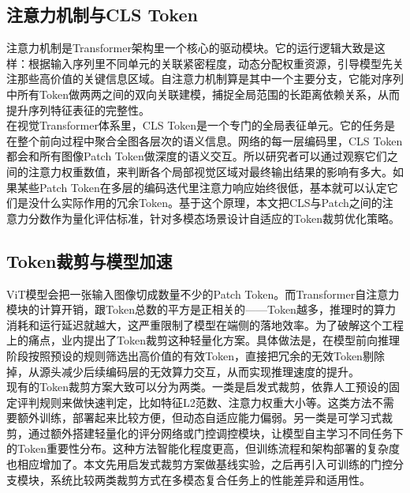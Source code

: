 \documentclass{article}
\begin{document}
{{{{{{{{		\subsection{注意力机制与CLS Token}
		{\setlength{\parindent}{2em}\setlength{\baselineskip}{20pt}\selectfont
			注意力机制是Transformer架构里一个核心的驱动模块。它的运行逻辑大致是这样：根据输入序列里不同单元的关联紧密程度，动态分配权重资源，引导模型先关注那些高价值的关键信息区域。自注意力机制算是其中一个主要分支，它能对序列中所有Token做两两之间的双向关联建模，捕捉全局范围的长距离依赖关系，从而提升序列特征表征的完整性。\\
			在视觉Transformer体系里，CLS Token是一个专门的全局表征单元。它的任务是在整个前向过程中聚合全图各层次的语义信息。网络的每一层编码里，CLS Token都会和所有图像Patch Token做深度的语义交互。所以研究者可以通过观察它们之间的注意力权重数值，来判断各个局部视觉区域对最终输出结果的影响有多大。如果某些Patch Token在多层的编码迭代里注意力响应始终很低，基本就可以认定它们是没什么实际作用的冗余Token。基于这个原理，本文把CLS与Patch之间的注意力分数作为量化评估标准，针对多模态场景设计自适应的Token裁剪优化策略。
		\subsection{Token裁剪与模型加速}
		{\setlength{\parindent}{2em}\setlength{\baselineskip}{20pt}\selectfont
			ViT模型会把一张输入图像切成数量不少的Patch Token。而Transformer自注意力模块的计算开销，跟Token总数的平方是正相关的——Token越多，推理时的算力消耗和运行延迟就越大，这严重限制了模型在端侧的落地效率。为了破解这个工程上的痛点，业内提出了Token裁剪这种轻量化方案。具体做法是，在模型前向推理阶段按照预设的规则筛选出高价值的有效Token，直接把冗余的无效Token剔除掉，从源头减少后续编码层的无效算力交互，从而实现推理速度的提升。\\
			现有的Token裁剪方案大致可以分为两类。一类是启发式裁剪，依靠人工预设的固定评判规则来做快速判定，比如特征L2范数、注意力权重大小等。这类方法不需要额外训练，部署起来比较方便，但动态自适应能力偏弱。另一类是可学习式裁剪，通过额外搭建轻量化的评分网络或门控调控模块，让模型自主学习不同任务下的Token重要性分布。这种方法智能化程度更高，但训练流程和架构部署的复杂度也相应增加了。本文先用启发式裁剪方案做基线实验，之后再引入可训练的门控分支模块，系统比较两类裁剪方式在多模态复合任务上的性能差异和适用性。
}}}}}}}}}}
\end{document}
